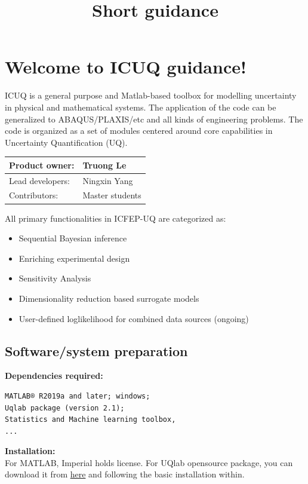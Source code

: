 \documentclass{ol-softwaremanual}
\title{Short guidance}
\begin{document}
\maketitle

\tableofcontents
\listoflistings
\newpage
\section{Welcome to ICUQ guidance!}\label{ICFEP-UQ_setup}
ICUQ is a general purpose and Matlab-based toolbox for modelling uncertainty in physical and mathematical systems. The application of the code can be generalized to ABAQUS/PLAXIS/etc and all kinds of engineering problems. The code is organized as a set of modules centered around core capabilities in Uncertainty Quantification (UQ).
\begin{table}[htbp]
\begin{tabular}{|l|l|}
\hline
\textbf{Product owner:} & Truong Le       \\ \hline
Lead developers:        & Ningxin Yang    \\ \hline
Contributors:           & Master students \\ \hline
\end{tabular}
\end{table}

All primary functionalities in ICFEP-UQ are categorized as:
\begin{itemize}
    \item Sequential Bayesian inference
    \item Enriching experimental design
    \item Sensitivity Analysis 
    \item Dimensionality reduction based surrogate models 
    \item User-defined loglikelihood for combined data sources (ongoing)
\end{itemize}

\subsection*{Software/system preparation}
\textbf{Dependencies required:}
\begin{verbatim}
MATLAB® R2019a and later; windows; 
Uqlab package (version 2.1); 
Statistics and Machine learning toolbox,
...
\end{verbatim}

\textbf{Installation:}\\
For MATLAB, Imperial holds license. For UQlab opensource package, you can download it from \href{https://www.uqlab.com/install}{here} and following the basic installation within.
\end{document}

